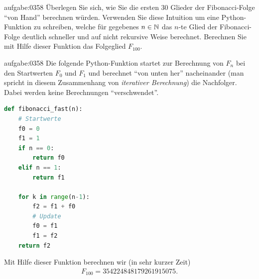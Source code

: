 \begin{aufgabe}{aufgabe:0358}
Überlegen Sie sich, wie Sie die ersten $30$ Glieder der Fibonacci-Folge \enquote{von Hand} berechnen würden. Verwenden Sie diese Intuition um eine Python-Funktion  zu schreiben, welche für gegebenes $n\in\mathbb{N}$ das $n$-te Glied der Fibonacci-Folge deutlich schneller und auf nicht rekursive Weise berechnet. Berechnen Sie mit Hilfe dieser Funktion das Folgeglied $F_{100}$.
\end{aufgabe}
\begin{antwort}{aufgabe:0358}
Die folgende Python-Funktion startet zur Berechnung von $F_n$ bei den Startwerten $F_0$ und $F_1$ und berechnet \enquote{von unten her} nacheinander (man spricht in diesem Zusammenhang von \textit{iterativer Berechnung}) die Nachfolger. Dabei werden keine Berechnungen \enquote{verschwendet}.
\begin{lstlisting}[language=Python,caption=iterative Berechnung der Fibonacci-Folge]
def fibonacci_fast(n):
    # Startwerte
    f0 = 0
    f1 = 1
    if n == 0:
        return f0
    elif n == 1:
        return f1
    
    for k in range(n-1):
        f2 = f1 + f0
        # Update
        f0 = f1
        f1 = f2
    return f2
\end{lstlisting}
Mit Hilfe dieser Funktion berechnen wir (in sehr kurzer Zeit)
\begin{align*}
    F_{100} = 354224848179261915075.
\end{align*}
\end{antwort}

